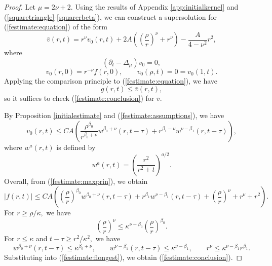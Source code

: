 \documentclass[12pt]{amsart}
\theoremstyle{others}
\numberwithin{equation}{section}
\newcommand{\p}{\partial}
\begin{document}
\begin{proof} Let $\mu = 2 \nu + 2.$ Using the results of Appendix \ref{app:initialkernel} and (\ref{squaretriangle}-\ref{squarerbeta}), we can construct a supersolution for (\ref{festimate:equation}) of the form
$$\bar{v}(r,t) = r^\nu  v_0(r,t) + 2 A \left( \left( \frac{\rho}{r} \right)^\nu + r^\nu \right) - \frac{A}{4 - \nu^2} r^{2},$$
where
$$\left( \p_t - \Delta_{\mu} \right) v_0 = 0,$$
$$v_0(r,0) = r^{-\nu} f(r,0), \qquad v_0(\rho,t) = 0 = v_0(1,t).$$
Applying the comparison principle to (\ref{festimate:equation}), we have
\begin{equation}\label{festimate:maxprin}
g(r,t) \leq \bar{v}(r,t),
\end{equation}
so it suffices to check (\ref{festimate:conclusion}) for $\bar{v}.$

By Proposition \ref{initialestimate} and (\ref{festimate:assumptions}), we have
\begin{equation*}
v_0(r,t) \leq C A \left( \frac{\rho^{\beta_0} }{r^{\beta_0 + \nu} }w^{\beta_0 + \nu} \left( r,t - \tau\right) + r^{\beta_1 - \nu} w^{\nu - \beta_1 }(r,t - \tau) \right),
\end{equation*}
where $w^a(r,t)$ is defined by
$$w^a(r,t) = \left( \frac{r^2}{r^2 + t} \right)^{a/2}.$$
Overall, from (\ref{festimate:maxprin}), we obtain
\begin{equation}\label{festimate:flongest}
| f(r,t) | \leq CA \left( \left( \frac{\rho}{r} \right)^{\beta_0} w^{\beta_0 + \nu}(r,t - \tau) + r^{\beta_1} w^{\nu - \beta_1}(r,t - \tau) + \left( \frac{\rho}{r} \right)^\nu  + r^\nu + r^{2} \right).
\end{equation}
For $r \geq \rho/ \kappa,$ we have
$$\left( \frac{\rho}{r} \right)^\nu \leq \kappa^{\nu - \beta_0} \left( \frac{\rho}{r} \right)^{\beta_0}.$$
For $r \leq \kappa$ and $t - \tau \geq r^2 / \kappa^2,$ we have
$$ w^{\beta_0 + \nu}(r,t - \tau) \leq \kappa^{\beta_0 + \nu} , \qquad w^{\nu - \beta_1}(r,t - \tau) \leq \kappa^{\nu - \beta_1}, \qquad r^\nu \leq \kappa^{\nu - \beta_1} r^{\beta_1}.$$
Substituting into (\ref{festimate:flongest}), we obtain (\ref{festimate:conclusion}).
\end{proof}
\end{document}
